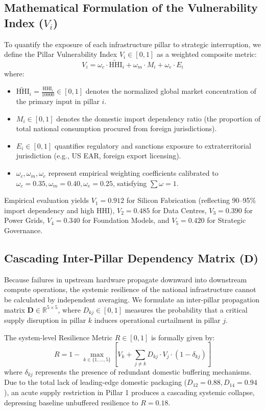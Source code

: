 \documentclass[conference,a4paper]{IEEEtran}
\begin{document}
\subsection{Mathematical Formulation of the Vulnerability Index ($V_i$)}
To quantify the exposure of each infrastructure pillar to strategic interruption, we define the Pillar Vulnerability Index $V_i \in [0, 1]$ as a weighted composite metric:
\begin{equation}
V_i = \omega_c \cdot \widetilde{\text{HHI}}_i + \omega_m \cdot M_i + \omega_e \cdot E_i
\label{eq:vuln}
\end{equation}
where:
\begin{itemize}
    \item $\widetilde{\text{HHI}}_i = \frac{\text{HHI}_i}{10000} \in [0, 1]$ denotes the normalized global market concentration of the primary input in pillar $i$.
    \item $M_i \in [0, 1]$ denotes the domestic import dependency ratio (the proportion of total national consumption procured from foreign jurisdictions).
    \item $E_i \in [0, 1]$ quantifies regulatory and sanctions exposure to extraterritorial jurisdiction (e.g., US EAR, foreign export licensing).
    \item $\omega_c, \omega_m, \omega_e$ represent empirical weighting coefficients calibrated to $\omega_c = 0.35, \omega_m = 0.40, \omega_e = 0.25$, satisfying $\sum \omega = 1$.
\end{itemize}

Empirical evaluation yields $V_1 = 0.912$ for Silicon Fabrication (reflecting 90–95\% import dependency and high HHI), $V_2 = 0.485$ for Data Centres, $V_3 = 0.390$ for Power Grids, $V_4 = 0.340$ for Foundation Models, and $V_5 = 0.420$ for Strategic Governance.

\subsection{Cascading Inter-Pillar Dependency Matrix ($\mathbf{D}$)}
Because failures in upstream hardware propagate downward into downstream compute operations, the systemic resilience of the national infrastructure cannot be calculated by independent averaging. We formulate an inter-pillar propagation matrix $\mathbf{D} \in \mathbb{R}^{5 \times 5}$, where $D_{kj} \in [0, 1]$ measures the probability that a critical supply disruption in pillar $k$ induces operational curtailment in pillar $j$.

The system-level Resilience Metric $R \in [0, 1]$ is formally given by:
\begin{equation}
R = 1 - \max_{k \in \{1,\dots,5\}} \left[ V_k + \sum_{j \neq k} D_{kj} \cdot V_j \cdot (1 - \delta_{kj}) \right]
\label{eq:resilience}
\end{equation}
where $\delta_{kj}$ represents the presence of redundant domestic buffering mechanisms. Due to the total lack of leading-edge domestic packaging ($D_{12} = 0.88, D_{14} = 0.94$), an acute supply restriction in Pillar 1 produces a cascading systemic collapse, depressing baseline unbuffered resilience to $R = 0.18$.
\end{document}

